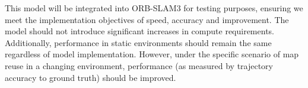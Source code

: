 
This model will be integrated into ORB-SLAM3 for testing purposes, ensuring we meet the implementation objectives of speed, accuracy and improvement. The model should not introduce significant increases in compute requirements. Additionally, performance in static environments should remain the same regardless of model implementation. However, under the specific scenario of map reuse in a changing environment, performance (as measured by trajectory accuracy to ground truth) should be improved.